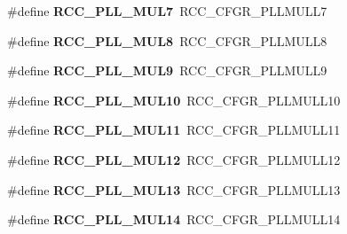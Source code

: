 \begin{DoxyCompactItemize}
\#define {\bfseries R\+C\+C\+\_\+\+P\+L\+L\+\_\+\+M\+U\+L7}~R\+C\+C\+\_\+\+C\+F\+G\+R\+\_\+\+P\+L\+L\+M\+U\+L\+L7
\item 
\mbox{\label{group___r_c_c_ex___p_l_l___multiplication___factor_gaddfa6ebdecba8c5951a774b271fa82eb}} 
\#define {\bfseries R\+C\+C\+\_\+\+P\+L\+L\+\_\+\+M\+U\+L8}~R\+C\+C\+\_\+\+C\+F\+G\+R\+\_\+\+P\+L\+L\+M\+U\+L\+L8
\item 
\mbox{\label{group___r_c_c_ex___p_l_l___multiplication___factor_ga653f185ecd0b9b440180433fb1a6ff3d}} 
\#define {\bfseries R\+C\+C\+\_\+\+P\+L\+L\+\_\+\+M\+U\+L9}~R\+C\+C\+\_\+\+C\+F\+G\+R\+\_\+\+P\+L\+L\+M\+U\+L\+L9
\item 
\mbox{\label{group___r_c_c_ex___p_l_l___multiplication___factor_ga07cdf351bcf4ffc95cd45a28008e43e5}} 
\#define {\bfseries R\+C\+C\+\_\+\+P\+L\+L\+\_\+\+M\+U\+L10}~R\+C\+C\+\_\+\+C\+F\+G\+R\+\_\+\+P\+L\+L\+M\+U\+L\+L10
\item 
\mbox{\label{group___r_c_c_ex___p_l_l___multiplication___factor_ga33153db08feae4d86a5c170e8a1781bd}} 
\#define {\bfseries R\+C\+C\+\_\+\+P\+L\+L\+\_\+\+M\+U\+L11}~R\+C\+C\+\_\+\+C\+F\+G\+R\+\_\+\+P\+L\+L\+M\+U\+L\+L11
\item 
\mbox{\label{group___r_c_c_ex___p_l_l___multiplication___factor_gaca5a5ddd829f682dd9a211e6a9be452a}} 
\#define {\bfseries R\+C\+C\+\_\+\+P\+L\+L\+\_\+\+M\+U\+L12}~R\+C\+C\+\_\+\+C\+F\+G\+R\+\_\+\+P\+L\+L\+M\+U\+L\+L12
\item 
\mbox{\label{group___r_c_c_ex___p_l_l___multiplication___factor_ga9b8d76a17aeb979992e61ec3a1e32a14}} 
\#define {\bfseries R\+C\+C\+\_\+\+P\+L\+L\+\_\+\+M\+U\+L13}~R\+C\+C\+\_\+\+C\+F\+G\+R\+\_\+\+P\+L\+L\+M\+U\+L\+L13
\item 
\mbox{\label{group___r_c_c_ex___p_l_l___multiplication___factor_ga6a96dc75a1fb43fb7f032a4cf34db287}} 
\#define {\bfseries R\+C\+C\+\_\+\+P\+L\+L\+\_\+\+M\+U\+L14}~R\+C\+C\+\_\+\+C\+F\+G\+R\+\_\+\+P\+L\+L\+M\+U\+L\+L14

\end{DoxyCompactItemize}

